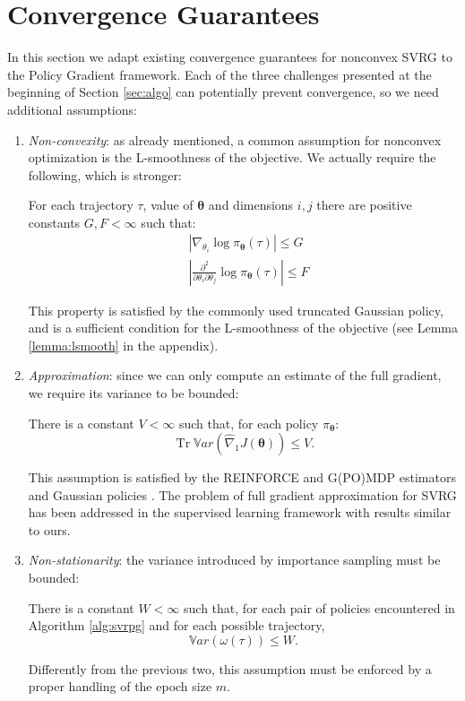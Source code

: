 \documentclass{article}
\theoremstyle{remark}
\theoremstyle{definition}
\DeclareMathOperator{\Tr}{Tr}
\newcommand{\vtheta}{\boldsymbol{\theta}}
\newcommand{\pol}{\pi_{\vtheta}}
\newcommand{\gradApp}[2]{\widehat{\nabla}_{#2}J(#1)}
\newcommand{\VARRF}{V}
\newcommand{\GRADLOG}{G}
\newcommand{\VARIS}{W}
\newcommand{\HESSLOG}{F}
\begin{document}
\section{Convergence Guarantees}\label{sec:conv}
In this section we adapt existing convergence guarantees for nonconvex SVRG \cite{reddi2016stochastic} \cite{allen2016variance} to the Policy Gradient framework.
Each of the three challenges presented at the beginning of Section \ref{sec:algo} can potentially prevent convergence, so we need additional assumptions:
\begin{enumerate}
\item \textit{Non-convexity}:
	as already mentioned, a common assumption for nonconvex optimization is the L-smoothness of the objective. We actually require the following, which is stronger:
	\begin{assumption}\label{ass:bounded_score}
		For each trajectory $\tau$, value of $\vtheta$ and dimensions $i,j$ there are positive constants $G,F<\infty$ such that:
		\begin{align*}
		&\left|\nabla_{\theta_i}\log\pi_{\vtheta}(\tau)\right| \leq \GRADLOG \\
		&\left|\frac{\partial^2}{\partial\theta_i\partial\theta_j}\log\pi_{\vtheta}(\tau)\right| \leq \HESSLOG
		\end{align*}
	\end{assumption}
	This property is satisfied by the commonly used truncated Gaussian policy, and is a sufficient condition for the L-smoothness of the objective (see Lemma \ref{lemma:lsmooth} in the appendix).
\item \textit{Approximation}:
since we can only compute an estimate of the full gradient, we require its variance to be bounded:
	\begin{assumption}\label{ass:REINFORCE}
		There is a constant $V<\infty$ such that, for each policy $\pol$:
		\[
		\Tr\mathbb{V}ar\left(\gradApp{\vtheta}{1}\right) \leq \VARRF.
		\]
	\end{assumption}
This assumption is satisfied by the REINFORCE and G(PO)MDP estimators and Gaussian policies \cite{zhao2011analysis} \cite{pirotta2013adaptive}. The problem of full gradient approximation for SVRG has been addressed in the supervised learning framework \cite{harikandeh2015stopwasting} with results similar to ours.
\item \textit{Non-stationarity}:
the variance introduced by importance sampling must be bounded:
	\begin{assumption}\label{ass:M2}
		There is a constant $W<\infty$ such that, for each pair of policies encountered in Algorithm \ref{alg:svrpg} and for each possible trajectory,
		\[
		\mathbb{V}ar\left(\omega(\tau)\right) \leq \VARIS.
		\]
	\end{assumption}
Differently from the previous two, this assumption must be enforced by a proper handling of the epoch size $m$.
\end{enumerate}
\end{document}
